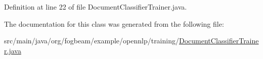 Definition at line 22 of file Document\+Classifier\+Trainer.\+java.



The documentation for this class was generated from the following file\+:\begin{DoxyCompactItemize}
\item 
src/main/java/org/fogbeam/example/opennlp/training/\hyperlink{_document_classifier_trainer_8java}{Document\+Classifier\+Trainer.\+java}\end{DoxyCompactItemize}
